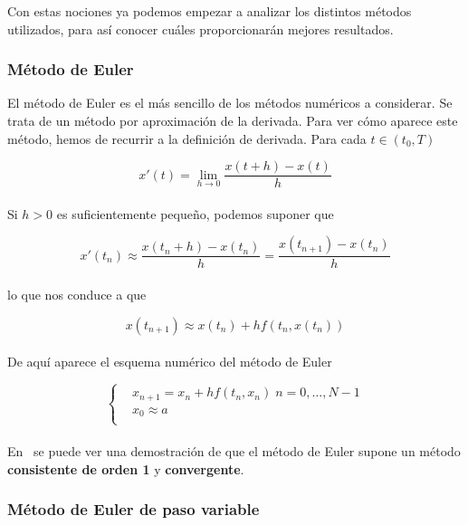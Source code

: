 Con estas nociones ya podemos empezar a analizar los distintos métodos
utilizados, para así conocer cuáles proporcionarán mejores resultados. 

\subsubsection{Método de Euler}
\label{makereference5.4.3.1}

El método de Euler es el más sencillo de los métodos numéricos a considerar. Se
trata de un método por aproximación de la derivada. Para ver cómo aparece este
método, hemos de recurrir a la definición de derivada. Para cada $t \in (t_0,T)$

\begin{equation}
		x'(t) = \lim_{h \to 0} \frac{x(t+h) - x(t)}{h} 	
\end{equation}\\

Si $h>0$ es suficientemente pequeño, podemos suponer que

\begin{equation}
		x'(t_n)\approx \frac{x(t_n+h) - x(t_n)}{h} = \frac{x(t_{n+1}) -
		x(t_n)}{h}	
\end{equation}\\

lo que nos conduce a que

\begin{equation}
		x(t_{n+1}) \approx x(t_n) + hf(t_n,x(t_n))	
\end{equation}\\

De aquí aparece el esquema numérico del método de Euler

\begin{equation}
		\left\{ \begin{aligned}
				& x_{n+1} = x_n + hf(t_n,x_n) \; n=0,\ldots,N-1 \\
				& x_0 \approx a \\
		\end{aligned} \right.
\end{equation}\\

En~\citet{ANNU} se puede ver una demostración de que el método de Euler supone
un método \textbf{consistente de orden 1} y \textbf{convergente}.

\subsubsection{Método de Euler de paso variable}
\label{makereference5.4.3.2}

